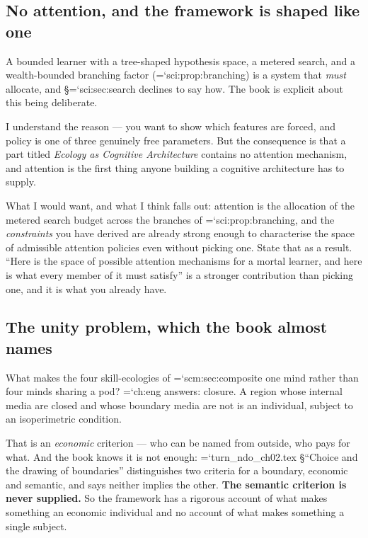 \documentclass[11pt,letterpaper]{article}
\newcommand{\loc}[1]{{\small\ttfamily\color{accent}\hyphenchar\font=`\-\relax #1}}
\newcommand{\fnd}[1]{\textbf{\color{warn}#1}}
\begin{document}
\subsection*{No attention, and the framework is shaped like one}

A bounded learner with a tree-shaped hypothesis space, a metered
search, and a wealth-bounded branching factor
(\loc{sci:prop:branching}) is a system that \emph{must} allocate, and
\S\loc{sci:sec:search} declines to say how. The book is explicit about
this being deliberate.

I understand the reason --- you want to show which features are forced,
and policy is one of three genuinely free parameters. But the
consequence is that a part titled \emph{Ecology as Cognitive
Architecture} contains no attention mechanism, and attention is the
first thing anyone building a cognitive architecture has to supply.

What I would want, and what I think falls out: attention is the
allocation of the metered search budget across the branches of
\loc{sci:prop:branching}, and the \emph{constraints} you have derived
are already strong enough to characterise the space of admissible
attention policies even without picking one. State that as a result.
``Here is the space of possible attention mechanisms for a mortal
learner, and here is what every member of it must satisfy'' is a
stronger contribution than picking one, and it is what you already
have.

\subsection*{The unity problem, which the book almost names}

What makes the four skill-ecologies of \loc{scm:sec:composite} one
mind rather than four minds sharing a pod? \loc{ch:eng} answers:
closure. A region whose internal media are closed and whose boundary
media are not is an individual, subject to an isoperimetric condition.

That is an \emph{economic} criterion --- who can be named from outside,
who pays for what. And the book knows it is not enough:
\loc{turn\_ndo\_ch02.tex} \S``Choice and the drawing of boundaries''
distinguishes two criteria for a boundary, economic and semantic, and
says neither implies the other. \fnd{The semantic criterion is never
supplied.} So the framework has a rigorous account of what makes
something an economic individual and no account of what makes something
a single subject.
\end{document}
